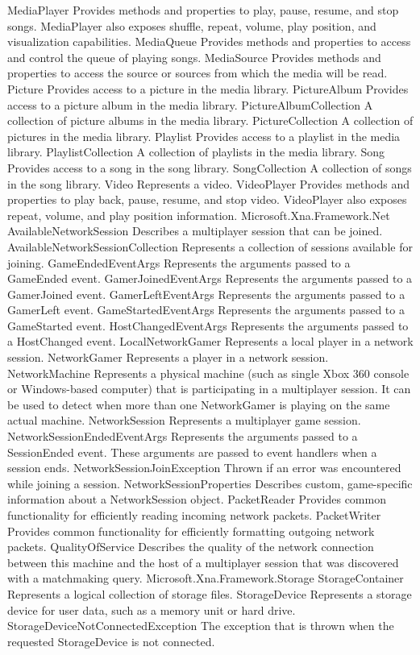 	MediaPlayer	Provides methods and properties to play, pause, resume, and stop songs. MediaPlayer also exposes shuffle, repeat, volume, play position, and visualization capabilities.
	MediaQueue	Provides methods and properties to access and control the queue of playing songs.
	MediaSource	Provides methods and properties to access the source or sources from which the media will be read.
	Picture	Provides access to a picture in the media library.
	PictureAlbum	Provides access to a picture album in the media library.
	PictureAlbumCollection	A collection of picture albums in the media library.
	PictureCollection	A collection of pictures in the media library.
	Playlist	Provides access to a playlist in the media library.
	PlaylistCollection	A collection of playlists in the media library.
	Song	Provides access to a song in the song library.
	SongCollection	A collection of songs in the song library.
	Video	Represents a video.
	VideoPlayer	Provides methods and properties to play back, pause, resume, and stop video. VideoPlayer also exposes repeat, volume, and play position information.
Microsoft.Xna.Framework.Net
	AvailableNetworkSession	Describes a multiplayer session that can be joined.
	AvailableNetworkSessionCollection	Represents a collection of sessions available for joining.
	GameEndedEventArgs	Represents the arguments passed to a GameEnded event.
	GamerJoinedEventArgs	Represents the arguments passed to a GamerJoined event.
	GamerLeftEventArgs	Represents the arguments passed to a GamerLeft event.
	GameStartedEventArgs	Represents the arguments passed to a GameStarted event.
	HostChangedEventArgs	Represents the arguments passed to a HostChanged event.
	LocalNetworkGamer	Represents a local player in a network session.
	NetworkGamer	 Represents a player in a network session.
	NetworkMachine	 Represents a physical machine (such as single Xbox 360 console or Windows-based computer) that is participating in a multiplayer session. It can be used to detect when more than one NetworkGamer is playing on the same actual machine.
	NetworkSession	Represents a multiplayer game session.
	NetworkSessionEndedEventArgs	Represents the arguments passed to a SessionEnded event. These arguments are passed to event handlers when a session ends.
	NetworkSessionJoinException	Thrown if an error was encountered while joining a session.
	NetworkSessionProperties	Describes custom, game-specific information about a NetworkSession object.
	PacketReader	Provides common functionality for efficiently reading incoming network packets.
	PacketWriter	Provides common functionality for efficiently formatting outgoing network packets.
	QualityOfService	 Describes the quality of the network connection between this machine and the host of a multiplayer session that was discovered with a matchmaking query.
Microsoft.Xna.Framework.Storage
	StorageContainer	Represents a logical collection of storage files.
	StorageDevice	Represents a storage device for user data, such as a memory unit or hard drive.
	StorageDeviceNotConnectedException	The exception that is thrown when the requested StorageDevice is not connected.


